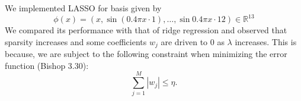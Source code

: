 \documentclass{article}
\begin{document}
\begin{multicols}{2}
We implemented LASSO for basis given by
\begin{equation}\phi(x)=(x, \sin{(0.4\pi x\cdot1)},\dots,\sin{0.4\pi x\cdot 12})\in \mathbb{R}^{13}
\end{equation}
We compared its performance with that of ridge regression and observed that sparsity increases and some coefficients $w_j$ are driven to 0 as $\lambda$ increases. This is because, we are subject to the following constraint when minimizing the error function (Bishop 3.30):
\begin{equation}\sum_{j=1}^M{|w_j|} \le \eta.\end{equation}

\end{multicols}
\end{document}
